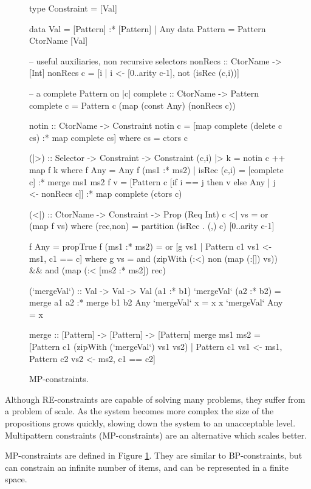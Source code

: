 \documentclass[preprint]{sigplanconf}
\begin{document}
\begin{figure}
\begin{code}
type Constraint = [Val]

data Val      =  [Pattern] :* [Pattern]
              |  Any
data Pattern  =  Pattern CtorName [Val]

-- useful auxiliaries, non recursive selectors
nonRecs :: CtorName -> [Int]
nonRecs c = [i | i <- [0..arity c-1], not (isRec (c,i))]

-- a complete Pattern on |c|
complete :: CtorName -> Pattern
complete c = Pattern c (map (const Any) (nonRecs c))

notin :: CtorName -> Constraint
notin c = [map complete (delete c cs) :* map complete cs]
    where cs = ctors c

(|>) :: Selector -> Constraint -> Constraint
(c,i) |> k = notin c ++ map f k
    where
    f Any = Any
    f (ms1 :* ms2) | isRec (c,i) = [complete c] :* merge ms1 ms2
    f v =  [Pattern c [if i == j then v else Any | j <- nonRecs c]]
           :* map complete (ctors c)

(<|) :: CtorName -> Constraint -> Prop (Req Int)
c <| vs = or (map f vs)
    where
    (rec,non) = partition (isRec . (,) c) [0..arity c-1]

    f Any = propTrue
    f (ms1 :* ms2) = or [g vs1 | Pattern c1 vs1 <- ms1, c1 == c]
        where g vs =  and (zipWith (:<) non (map (:[]) vs)) &&
                      and (map (:< [ms2 :* ms2]) rec)

(`mergeVal`) :: Val -> Val -> Val
(a1 :* b1) `mergeVal` (a2 :* b2)  = merge a1 a2 :* merge b1 b2
Any        `mergeVal` x           = x
x          `mergeVal` Any         = x

merge :: [Pattern] -> [Pattern] -> [Pattern]
merge  ms1 ms2 = [Pattern c1 (zipWith (`mergeVal`) vs1 vs2) |
       Pattern c1 vs1 <- ms1, Pattern c2 vs2 <- ms2, c1 == c2]
\end{code}
\caption{MP-constraints.}
\label{fig:enumeration}
\end{figure}

Although RE-constraints are capable of solving many problems, they suffer from a problem of scale. As the system becomes more complex the size of the propositions grows quickly, slowing down the system to an unacceptable level. Multipattern constraints (MP-constraints) are an alternative which scales better.

MP-constraints are defined in Figure \ref{fig:enumeration}. They are similar to BP-constraints, but can constrain an infinite number of items, and can be represented in a finite space.
\end{document}
